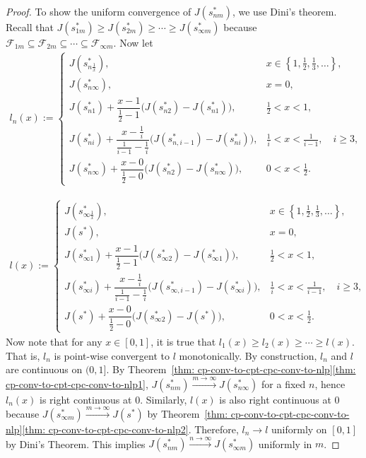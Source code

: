 \documentclass[12pt,leqno]{amsart}
\begin{document}
\begin{proof}
To show the uniform convergence of $J(s_{nm}^*)$, we use Dini's theorem. Recall that $J(s_{1m}^*)\geq J(s_{2m}^*)\geq\cdots\geq J(s_{\infty m}^*)$ because $\mathcal{F}_{1m}\subseteq\mathcal{F}_{2m}\subseteq\cdots\subseteq\mathcal{F}_{\infty m}$. Now let 
\begin{align*}
l_n(x)
:=
\begin{cases}
J\!\left(s_{n\frac{1}{x}}^*\right), & x \in \left\{1,\frac12,\frac13,\ldots\right\},\\[4pt]
J\!\left(s_{n\infty}^*\right), & x=0,\\[8pt]
J\!\left(s_{n1}^*\right)
+ \dfrac{x-1}{\frac12-1}\Big(J\!\left(s_{n2}^*\right)-J\!\left(s_{n1}^*\right)\Big),
& \frac12 < x < 1,\\[10pt]
J\!\left(s_{n i}^*\right)
+ \dfrac{x-\frac{1}{i}}{\frac{1}{i-1}-\frac{1}{i}}
\Big(J\!\left(s_{n,i-1}^*\right)-J\!\left(s_{n i}^*\right)\Big),
& \frac{1}{i} < x < \frac{1}{i-1},\quad i\ge 3,\\[12pt]
J\!\left(s_{n\infty}^*\right)
+ \dfrac{x-0}{\frac12-0}\Big(J\!\left(s_{n2}^*\right)-J\!\left(s_{n\infty}^*\right)\Big),
& 0 < x < \frac12.
\end{cases}
\end{align*}

\begin{align*}
l(x)
:=
\begin{cases}
J\!\left(s_{\infty\frac{1}{x}}^*\right), & x \in \left\{1,\frac12,\frac13,\ldots\right\},\\[4pt]
J\!\left(s^*\right), & x=0,\\[8pt]
J\!\left(s_{\infty 1}^*\right)
+ \dfrac{x-1}{\frac12-1}\Big(J\!\left(s_{\infty 2}^*\right)-J\!\left(s_{\infty 1}^*\right)\Big),
& \frac12 < x < 1,\\[10pt]
J\!\left(s_{\infty i}^*\right)
+ \dfrac{x-\frac{1}{i}}{\frac{1}{i-1}-\frac{1}{i}}
\Big(J\!\left(s_{\infty,i-1}^*\right)-J\!\left(s_{\infty i}^*\right)\Big),
& \frac{1}{i} < x < \frac{1}{i-1},\quad i\ge 3,\\[12pt]
J\!\left(s^*\right)
+ \dfrac{x-0}{\frac12-0}\Big(J\!\left(s_{\infty 2}^*\right)-J\!\left(s^*\right)\Big),
& 0 < x < \frac12.
\end{cases}
\end{align*}
Now note that for any $x\in [0, 1]$, it is true that $l_1(x) \geq l_2(x)\geq\cdots\geq l(x)$. That is, $l_n$ is point-wise convergent to $l$ monotonically. By construction, $l_n$ and $l$ are continuous on $(0,1]$. By Theorem~\ref{thm: cp-conv-to-cpt-cpc-conv-to-nlp}\ref{thm: cp-conv-to-cpt-cpc-conv-to-nlp1}, $J(s_{nm}^*)\xrightarrow{m\rightarrow\infty}J(s_{n\infty}^*)$ for a fixed $n$, hence $l_n(x)$ is right continuous at $0$. Similarly, $l(x)$ is also right continuous at $0$ because $J(s_{\infty m}^*)\xrightarrow{m\rightarrow\infty}J(s^*)$ by Theorem~\ref{thm: cp-conv-to-cpt-cpc-conv-to-nlp}\ref{thm: cp-conv-to-cpt-cpc-conv-to-nlp2}. Therefore, $l_n\rightarrow l$ uniformly on $[0, 1]$ by Dini's Theorem. This implies $J(s_{nm}^*)\xrightarrow{n\rightarrow\infty}J(s_{\infty m}^*)$ uniformly in $m$.
\end{proof}
\end{document}
